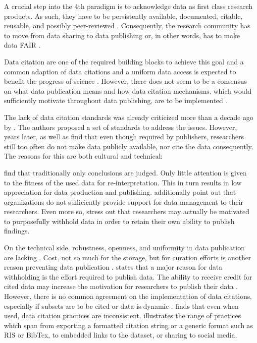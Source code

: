 \documentclass[a4paper,10pt]{article}
\begin{document}
A crucial step into the 4th paradigm is to acknowledge data as first class research products. As such, they have to be persistently available, documented, citable, reusable, and possibly peer-reviewed \citep{Callaghan2012, Kratz2014}. Consequently, the research community has to move from data sharing to data publishing \citep{Costello2009, Kratz2014} or, in other words, has to make data \gls{FAIR} \citep{Wilkinson2016}. 

Data citation are one of the required building blocks to achieve this goal and a common adaption of data citations and a uniform data access is expected to benefit the progress of science \citep{CODATA2013}. However, there does not seem to be a consensus on what data publication means \citep{Kratz2014} and how data citation mechanisms, which would sufficiently motivate throughout data publishing, are to be implemented \citep{Costello2009}.

The lack of data citation standards was already criticized more than a decade ago by \cite{AltKin07}. The authors proposed a set of standards to address the issues. However, years later, \cite{Altman2015} as well as \cite{Tenopir2011} find that even though required by publishers, researchers still too often do not make data publicly available, nor cite the data consequently. The reasons for this are both cultural and technical: 

\cite{Lawrence2011} find that traditionally only conclusions are judged. Only little attention is given to the fitness of the used data for re-interpretation. This in turn results in low appreciation for data production and publishing. \cite{Tenopir2011} additionally point out that organizations do not sufficiently provide support for data management to their researchers. Even more so, \cite{Tenopir2011} stress out that researchers may actually be motivated to purposefully withhold data in order to retain their own ability to publish findings.

On the technical side, robustness, openness, and uniformity in data publication are lacking \citep{Starr2015, Koltay2016}. Cost, not so much for the storage, but for curation efforts is another reason preventing data publication \citep{Gray2002}.
\citep{Tenopir2011} states that a major reason for data withholding is the effort required to publish data. 
The ability to receive credit for cited data may increase the motivation for researchers to publish their data \citep{Crosas2011, AltKin07}. However, there is no common agreement on the implementation of data citations, especially if subsets are to be cited or data is dynamic \citep{Kratz2014, Assante2016}. \cite{Belter2014} finds that even when used, data citation practices are inconsistent. \cite{Assante2016} illustrates the range of practices which span from exporting a formatted citation string or a generic format such as RIS or BibTex, to embedded links to the dataset, or sharing to social media. 
\end{document}
